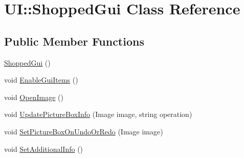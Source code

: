 \hypertarget{class_u_i_1_1_shopped_gui}{
\section{UI::ShoppedGui Class Reference}
\label{class_u_i_1_1_shopped_gui}
}
\subsection*{Public Member Functions}
\begin{DoxyCompactItemize}
\item 
\hyperlink{class_u_i_1_1_shopped_gui_a3aa57a391c2005ffafa61ff34be5d4b6}{ShoppedGui} ()
\item 
void \hyperlink{class_u_i_1_1_shopped_gui_a190bba777e57891c8042b86afbba83c6}{EnableGuiItems} ()
\item 
void \hyperlink{class_u_i_1_1_shopped_gui_a3a27f074b7b204b1df148921a0dcc20c}{OpenImage} ()
\item 
void \hyperlink{class_u_i_1_1_shopped_gui_a7e94e570fc92b635f64b1e540c2c86cd}{UpdatePictureBoxInfo} (Image image, string operation)
\item 
void \hyperlink{class_u_i_1_1_shopped_gui_a9771176182b68022bc433aba6e42395f}{SetPictureBoxOnUndoOrRedo} (Image image)
\item 
void \hyperlink{class_u_i_1_1_shopped_gui_a292a827437d7f2098c13bc1a735a569e}{SetAdditionalInfo} ()
\end{DoxyCompactItemize}
